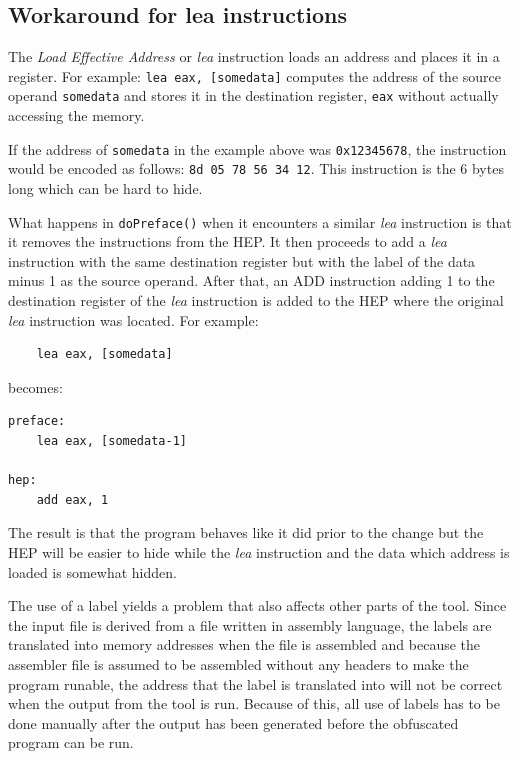 \documentclass[11pt,twoside]{eitExjobb}
\begin{document}
\subsection{Workaround for lea instructions}
The \emph{Load Effective Address} or \emph{lea} instruction loads an address and places it in a register. For example: \texttt{lea eax, [somedata]} computes the address of the source operand \texttt{somedata} and stores it in the destination register, \texttt{eax} without actually accessing the memory. 

If the address of \texttt{somedata} in the example above was \texttt{0x12345678}, the instruction would be encoded as follows: \texttt{8d 05 78 56 34 12}. This instruction is the 6 bytes long which can be hard to hide. 

What happens in \texttt{doPreface()} when it encounters a similar \emph{lea} instruction is that it removes the instructions from the HEP. It then proceeds to add a \emph{lea} instruction with the same destination register but with the label of the data minus 1 as the source operand. After that, an ADD instruction adding 1 to the destination register of the \emph{lea} instruction is added to the HEP where the original \emph{lea} instruction was located. For example:

\begin{verbatim}
    lea eax, [somedata]
\end{verbatim}

\noindent becomes:

\begin{verbatim}
preface:
    lea eax, [somedata-1]

hep:
    add eax, 1
\end{verbatim}

\noindent The result is that the program behaves like it did prior to the change but the HEP will be easier to hide while the \emph{lea} instruction and the data which address is loaded is somewhat hidden.

The use of a label yields a problem that also affects other parts of the tool. Since the input file is derived from a file written in assembly language, the labels are translated into memory addresses when the file is assembled and because the assembler file is assumed to be assembled without any headers to make the program runable, the address that the label is translated into will not be correct when the output from the tool is run. Because of this, all use of labels has to be done manually after the output has been generated before the obfuscated program can be run.
\end{document}
